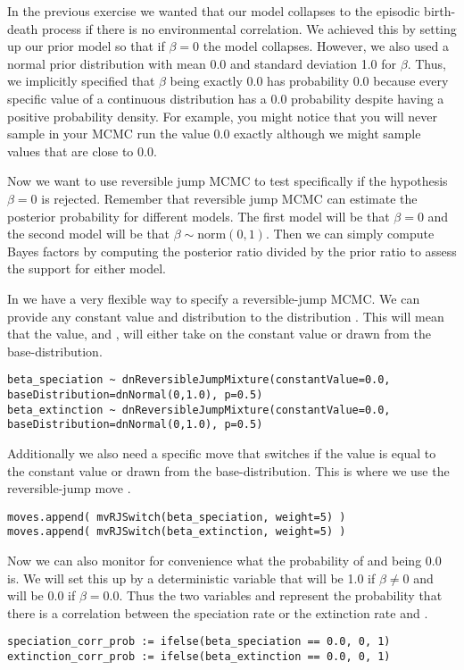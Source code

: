 In the previous exercise we wanted that our model collapses to the episodic birth-death process if there is no environmental correlation.
We achieved this by setting up our prior model so that if $\beta=0$ the model collapses.
However, we also used a normal prior distribution with mean 0.0 and standard deviation 1.0 for $\beta$.
Thus, we implicitly specified that $\beta$ being exactly 0.0 has probability 0.0 because every specific value of a continuous distribution has a 0.0 probability despite having a positive probability density.
For example, you might notice that you will never sample in your MCMC run the value 0.0 exactly although we might sample values that are close to 0.0.

Now we want to use reversible jump MCMC to test specifically if the hypothesis $\beta=0$ is rejected.
Remember that reversible jump MCMC can estimate the posterior probability for different models.
The first model will be that $\beta=0$ and the second model will be that $\beta \sim \text{norm}(0,1)$.
Then we can simply compute Bayes factors by computing the posterior ratio divided by the prior ratio to assess the support for either model.

In \RevBayes we have a very flexible way to specify a reversible-jump MCMC.
We can provide any constant value and distribution to the distribution .
This will mean that the value,  and , will either take on the constant value or drawn from the base-distribution.
{\tt \begin{snugshade*}
\begin{lstlisting}
beta_speciation ~ dnReversibleJumpMixture(constantValue=0.0, baseDistribution=dnNormal(0,1.0), p=0.5)
beta_extinction ~ dnReversibleJumpMixture(constantValue=0.0, baseDistribution=dnNormal(0,1.0), p=0.5)
\end{lstlisting}
\end{snugshade*}}
Additionally we also need a specific move that switches if the value is equal to the constant value or drawn from the base-distribution.
This is where we use the reversible-jump move .
{\tt \begin{snugshade*}
\begin{lstlisting}moves.append( mvRJSwitch(beta_speciation, weight=5) )
moves.append( mvRJSwitch(beta_extinction, weight=5) )
\end{lstlisting}
\end{snugshade*}}
Now we can also monitor for convenience what the probability of  and  being 0.0 is.
We will set this up by a deterministic variable that will be 1.0 if $\beta \neq 0$ and will be 0.0 if $\beta = 0.0$.
Thus the two variables  and  represent the probability that there is a correlation between the speciation rate or the extinction rate and \COO.
{\tt \begin{snugshade*}
\begin{lstlisting}
speciation_corr_prob := ifelse(beta_speciation == 0.0, 0, 1)
extinction_corr_prob := ifelse(beta_extinction == 0.0, 0, 1)
\end{lstlisting}
\end{snugshade*}}

